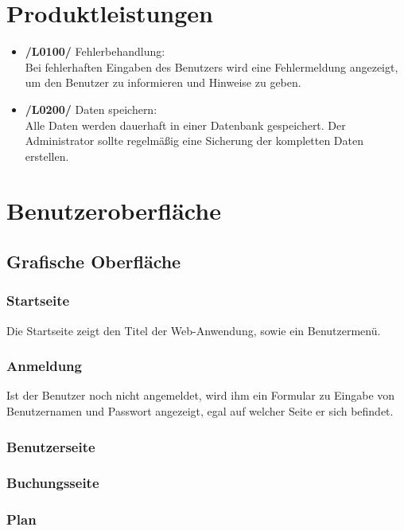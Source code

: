 \documentclass[a4paper,oneside]{scrreprt}
\begin{document}
\chapter{Produktleistungen}

\begin{itemize}
\item \textbf{/L0100/} Fehlerbehandlung: \\
Bei fehlerhaften Eingaben des Benutzers wird eine Fehlermeldung angezeigt, um den Benutzer zu informieren und Hinweise zu geben.

\item \textbf{/L0200/} Daten speichern: \\
Alle Daten werden dauerhaft in einer Datenbank gespeichert. Der Administrator sollte regelmäßig eine Sicherung der kompletten Daten erstellen.
\end{itemize}


\chapter{Benutzeroberfläche}

\section{Grafische Oberfläche}

\subsection*{Startseite}

Die Startseite zeigt den Titel der Web-Anwendung, sowie ein Benutzermenü. 

\subsection*{Anmeldung}

Ist der Benutzer noch nicht angemeldet, wird ihm ein Formular zu Eingabe von Benutzernamen und Passwort angezeigt, egal auf welcher Seite er sich befindet.

\subsection*{Benutzerseite}
\subsection*{Buchungsseite}
\subsection*{Plan}
\end{document}
